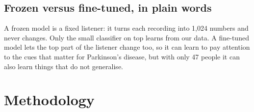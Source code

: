\documentclass[11pt,a4paper]{article}
\begin{document}
\subsection{Frozen versus fine-tuned, in plain words}
\begin{tcolorbox}[colback=green!3,colframe=green!40!black,boxrule=0.5pt,arc=2pt,left=5pt,right=5pt,top=3pt,bottom=3pt,title={\small\bfseries In plain words}]\small A frozen model is a fixed listener: it turns each recording into 1,024 numbers and never changes. Only the small classifier on top learns from our data. A fine-tuned model lets the top part of the listener change too, so it can learn to pay attention to the cues that matter for Parkinson's disease, but with only 47 people it can also learn things that do not generalise.\end{tcolorbox}
\section{Methodology}\label{sec:method}
\end{document}
